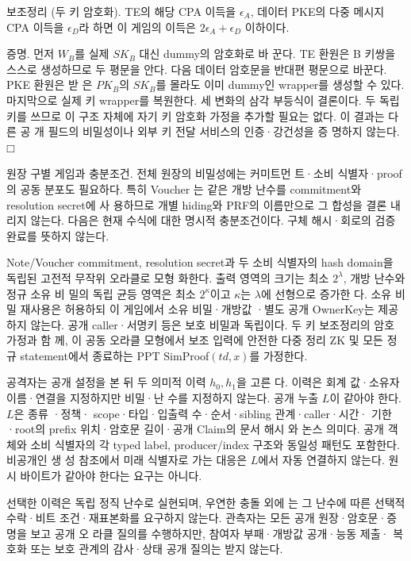 보조정리 (두 키 암호화). TE의 해당 CPA 이득을 \(\epsilon _{A}\), 데이터
PKE의 다중 메시지 CPA 이득을 \(\epsilon _{D}\)라 하면 이 게임의 이득은
\(2\epsilon _{A}+\epsilon _{D}\) 이하이다.

증명. 먼저 \(W_{B}\)를 실제 \(SK_{B}\) 대신 dummy의 암호화로 바
꾼다. TE 환원은 B 키쌍을 스스로 생성하므로 두 평문을 안다.
다음 데이터 암호문을 반대편 평문으로 바꾼다. PKE 환원은 받
은 \(PK_{B}\)의 \(SK_{B}\)를 몰라도 이미 dummy인 wrapper를 생성할
수 있다. 마지막으로 실제 키 wrapper를 복원한다. 세 변화의
삼각 부등식이 결론이다. 두 독립 키를 쓰므로 이 구조 자체에
자기 키 암호화 가정을 추가할 필요는 없다. 이 결과는 다른 공
개 필드의 비밀성이나 외부 키 전달 서비스의 인증·강건성을 증
명하지 않는다. \(□\)

원장 구별 게임과 충분조건. 전체 원장의 비밀성에는 커미트먼
트·소비 식별자·proof의 공동 분포도 필요하다. 특히 Voucher
는 같은 개방 난수를 commitment와 resolution secret에 사
용하므로 개별 hiding와 PRF의 이름만으로 그 합성을 결론 내
리지 않는다. 다음은 현재 수식에 대한 명시적 충분조건이다.
구체 해시·회로의 검증 완료를 뜻하지 않는다.

Note/Voucher commitment, resolution secret과 두 소비
식별자의 hash domain을 독립된 고전적 무작위 오라클로 모형
화한다. 출력 영역의 크기는 최소 \(2^{λ}\), 개방 난수와 정규 소유 비
밀의 독립 균등 영역은 최소 \(2^{κ}\)이고 \(κ\)는 \(λ\)에 선형으로 증가한
다. 소유 비밀 재사용은 허용하되 이 게임에서 소유 비밀·개방값
·별도 공개 OwnerKey는 제공하지 않는다. 공개 caller·서명키
등은 보호 비밀과 독립이다. 두 키 보조정리의 암호 가정과 함
께, 이 공동 오라클 모형에서 보조 입력에 안전한 다중 정리 ZK
및 모든 정규 statement에서 종료하는 PPT SimProof\((td,x)\)를
가정한다.

공격자는 공개 설정을 본 뒤 두 의미적 이력 \(h_{0},h_{1}\)을 고른
다. 이력은 회계 값·소유자 이름·연결을 지정하지만 비밀·난
수를 지정하지 않는다. 공개 누출 \(L\)이 같아야 한다. \(L\)은 종류
·정책· scope·타입·입출력 수·순서·sibling 관계·caller·시간·
기한·root의 prefix 위치·암호문 길이·공개 Claim의 문서 해시
와 논스 의미다. 공개 객체와 소비 식별자의 각 typed label,
producer/index 구조와 동일성 패턴도 포함한다. 비공개인 생
성 참조에서 미래 식별자로 가는 대응은 \(L\)에서 자동 연결하지
않는다. 원시 바이트가 같아야 한다는 요구는 아니다.

선택한 이력은 독립 정직 난수로 실현되며, 우연한 충돌 외에
는 그 난수에 따른 선택적 수락·비트 조건·재표본화를 요구하지
않는다. 관측자는 모든 공개 원장·암호문·증명을 보고 공개 오
라클 질의를 수행하지만, 참여자 부패·개방값 공개·능동 제출·
복호화 또는 보호 관계의 감사·상태 공개 질의는 받지 않는다.

